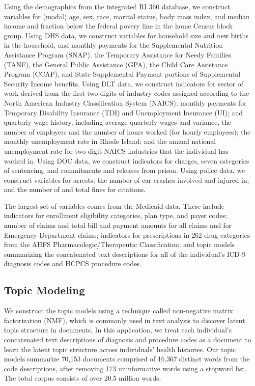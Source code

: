 \documentclass[10pt, letter]{article}
\begin{document}
Using the demographics from the integrated RI 360 database, we construct variables for (modal) age, sex, race, marital status, body mass index, and median income and fraction below the federal povery line in the home Census block group. Using DHS data, we construct variables for household size and new births in the household, and monthly payments for the Supplemental Nutrition Assistance Program (SNAP), the Temporary Assistance for Needy Families (TANF), the General Public Assistance (GPA), the Child Care Assistance Program (CCAP), and State Supplemental Payment portions of Supplemental Security Income benefits. Using DLT data, we construct indicators for sector of work derived from the first two digits of industry codes assigned according to the North American Industry Classification System (NAICS); monthly payments for Temporary Disability Insurance (TDI) and Unemployment Insurance (UI); and quarterly wage history, including average quarterly wages and variance, the number of employers and the number of hours worked (for hourly employees); the monthly unemployment rate in Rhode Island; and the annual national unemployment rate for two-digit NAICS industries that the individual has worked in. Using DOC data, we construct indicators for charges, seven categories of sentencing, and commitments and releases from prison. Using police data, we construct variables for arrests; the number of car crashes involved and injured in; and the number of and total fines for citations.

The largest set of variables comes from the Medicaid data. These include indicators for enrollment eligibility categories, plan type, and payer codes; number of claims and total bill and payment amounts for all claims and for Emergency Department claims; indicators for prescriptions in 262 drug categories from the AHFS Pharmacologic/Therapeutic Classification; and topic models summarizing the concatenated text descriptions for all of the individual's ICD-9 diagnosis codes and HCPCS procedure codes.

\subsection{Topic Modeling}

We construct the topic models using a technique called non-negative matrix factorization (NMF), which is commonly used in text analysis to discover latent topic structure in documents. In this application, we treat each individual's concatenated text descriptions of diagnosis and procedure codes as a document to learn the latent topic structure across individuals' health histories. Our topic models summarize 70,153 documents comprised of 16,367 distinct words from the code descriptions, after removing 173 uninformative words using a stopword list. The total corpus consists of over 20.5 million words.
\end{document}
